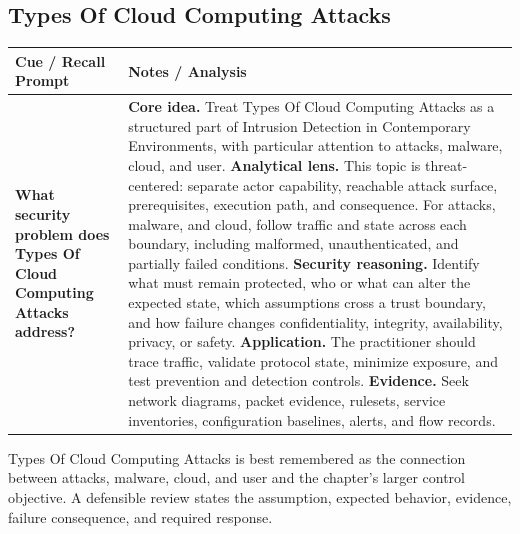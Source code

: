 \documentclass[11pt]{article}
\newcommand{\CornellHeader}{%
\rowcolor{Navy}\color{white}\bfseries Cue / Recall Prompt & \color{white}\bfseries Notes / Analysis\\\hline}
\newcommand{\CornellRow}[2]{%
\cellcolor{CueGray}\RaggedRight\textbf{#1} & \RaggedRight #2\\\hline}
\begin{document}
\subsection*{Types Of Cloud Computing Attacks}
\begin{longtable}{>{\RaggedRight\arraybackslash}p{}|>{\RaggedRight\arraybackslash}p{}}
\CornellHeader
\CornellRow{What security problem does Types Of Cloud Computing Attacks address?}{\textbf{Core idea.} Treat Types Of Cloud Computing Attacks as a structured part of Intrusion Detection in Contemporary Environments, with particular attention to attacks, malware, cloud, and user. \textbf{Analytical lens.} This topic is threat-centered: separate actor capability, reachable attack surface, prerequisites, execution path, and consequence. For attacks, malware, and cloud, follow traffic and state across each boundary, including malformed, unauthenticated, and partially failed conditions. \textbf{Security reasoning.} Identify what must remain protected, who or what can alter the expected state, which assumptions cross a trust boundary, and how failure changes confidentiality, integrity, availability, privacy, or safety. \textbf{Application.} The practitioner should trace traffic, validate protocol state, minimize exposure, and test prevention and detection controls. \textbf{Evidence.} Seek network diagrams, packet evidence, rulesets, service inventories, configuration baselines, alerts, and flow records.}
\end{longtable}
\begin{topicsummary}
Types Of Cloud Computing Attacks is best remembered as the connection between attacks, malware, cloud, and user and the chapter's larger control objective. A defensible review states the assumption, expected behavior, evidence, failure consequence, and required response.
\end{topicsummary}
\end{document}
